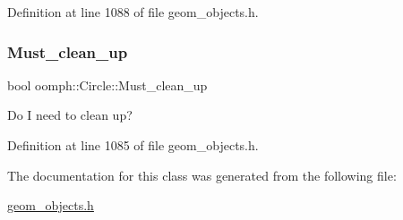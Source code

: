 Definition at line 1088 of file geom\+\_\+objects.\+h.

\mbox{\label{classoomph_1_1Circle_a7defb16434b9f6f5126323ab49100a1b}} 
\subsubsection{\texorpdfstring{Must\+\_\+clean\+\_\+up}{Must\_clean\_up}}
{\footnotesize\ttfamily bool oomph\+::\+Circle\+::\+Must\+\_\+clean\+\_\+up\hspace{0.3cm}{\ttfamily [protected]}}



Do I need to clean up? 



Definition at line 1085 of file geom\+\_\+objects.\+h.



The documentation for this class was generated from the following file\+:\begin{DoxyCompactItemize}
\item 
\hyperlink{geom__objects_8h}{geom\+\_\+objects.\+h}\end{DoxyCompactItemize}
